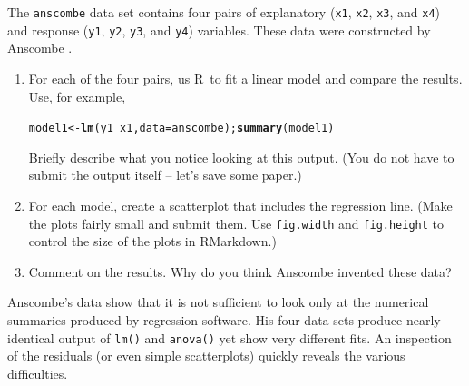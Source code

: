 \documentclass[twoside]{book}\usepackage[]{graphicx}\usepackage[]{xcolor}
\makeatletter
\newcommand{\hlopt}[1]{\textcolor[rgb]{0,0,0}{#1}}%
\newcommand{\hlstd}[1]{\textcolor[rgb]{0.345,0.345,0.345}{#1}}%
\newcommand{\hlkwb}[1]{\textcolor[rgb]{0.69,0.353,0.396}{#1}}%
\newcommand{\hlkwc}[1]{\textcolor[rgb]{0.333,0.667,0.333}{#1}}%
\newcommand{\hlkwd}[1]{\textcolor[rgb]{0.737,0.353,0.396}{\textbf{#1}}}%
\newenvironment{kframe}{%
 \def\at@end@of@kframe{}%
 \ifinner\ifhmode%
  \def\at@end@of@kframe{\end{minipage}}%
  \begin{minipage}{\columnwidth}%
 \fi\fi%
 \def\FrameCommand##1{\hskip\@totalleftmargin \hskip-\fboxsep
 \colorbox{shadecolor}{##1}\hskip-\fboxsep
     \hskip-\linewidth \hskip-\@totalleftmargin \hskip\columnwidth}%
 \MakeFramed {\advance\hsize-\width
   \@totalleftmargin\z@ \linewidth\hsize
   \@setminipage}}%
 {\par\unskip\endMakeFramed%
 \at@end@of@kframe}
\newenvironment{knitrout}{}{} %
\newcommand{\variable}[1]{{\color{green!50!black}\texttt{#1}}}
\newcommand{\Rindex}[1]{\index{\texttt{#1}}}
\newcommand{\dataframe}[1]{{\color{blue!80!black}\texttt{#1}}\Rindex{#1}}
\def\R{{\sf R}}
\newcounter{example}[section]
\makeatother
\begin{document}
\begin{problem}
	The \dataframe{anscombe} data set contains four pairs of explanatory 
	(\variable{x1}, \variable{x2}, \variable{x3}, and \variable{x4})
	and response
	(\variable{y1}, \variable{y2}, \variable{y3}, and \variable{y4})
	variables.  These data were constructed by Anscombe 
	\cite{Anscombe:1973:Graphs}.
	\begin{enumerate}
		\item 
			For each of the four pairs, us \R\ to fit a linear model and 
			compare the results.  Use, for example,
\begin{knitrout}
\color{fgcolor}\begin{kframe}
\begin{alltt}
\hlstd{model1} \hlkwb{<-} \hlkwd{lm}\hlstd{( y1} \hlopt{~} \hlstd{x1,} \hlkwc{data}\hlstd{=anscombe );} \hlkwd{summary}\hlstd{(model1)}
\end{alltt}
\end{kframe}
\end{knitrout}
			Briefly describe what you notice looking at this output.  (You do not have
			to submit the output itself -- let's save some paper.)
		\item
			For each model, create a scatterplot that includes the regression line.
			(Make the plots fairly small and submit them.
			Use \texttt{fig.width} and \texttt{fig.height} to control the size of 
			the plots in RMarkdown.)
		\item
			Comment on the results.  Why do you think Anscombe invented these data?
	\end{enumerate}
\end{problem}

\begin{solution}
  Anscombe's data show that it is not sufficient to look only at the 
  numerical summaries produced by regression software.  His four data
  sets produce nearly identical output of \verb!lm()! and \verb!anova()!
  yet show very different fits.  An inspection of the residuals (or even
  simple scatterplots) quickly reveals the various difficulties.
\end{solution}
\end{document}
